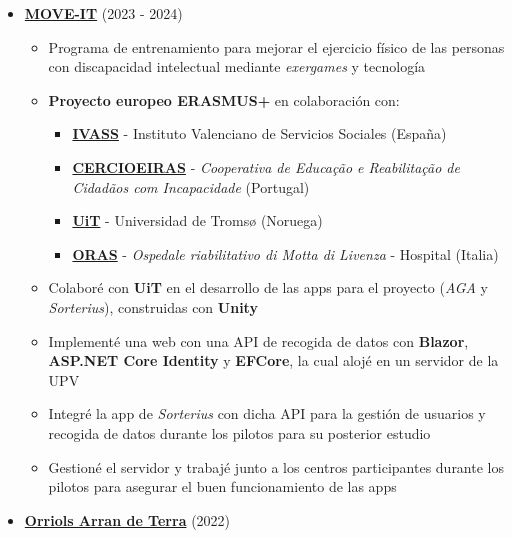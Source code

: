 \documentclass[letterpaper, 12pt, dvipsnames]{article}
\newcommand{\upv}{UPV}
\begin{document}
\vspace{1em}

\begin{itemize}
    \item {\large\textbf{\href{https://moveit.webs.upv.es/es/}{MOVE-IT}}} (2023 - 2024)
          \begin{itemize}
              \item Programa de entrenamiento para mejorar el ejercicio físico de las personas con discapacidad intelectual mediante \textit{exergames} y tecnología
              \item \textbf{Proyecto europeo ERASMUS+} en colaboración con:
                    \begin{itemize}
                        \item \textbf{\href{https://www.ivass.gva.es/}{IVASS}} - Instituto Valenciano de Servicios Sociales (España)
                        \item \textbf{\href{https://www.cercioeiras.pt/pt}{CERCIOEIRAS}} - \textit{Cooperativa de Educação e Reabilitação de Cidadãos com Incapacidade} (Portugal)
                        \item \textbf{\href{https://en.uit.no/}{UiT}} - Universidad de Tromsø (Noruega)
                        \item \textbf{\href{https://www.ospedalemotta.it/it/}{ORAS}} - \textit{Ospedale riabilitativo di Motta di Livenza} - Hospital (Italia)
                    \end{itemize}
              \item Colaboré con \textbf{UiT} en el desarrollo de las apps para el proyecto (\textit{AGA} y \textit{Sorterius}), construidas con \textbf{Unity}
              \item Implementé una web con una API de recogida de datos con \textbf{Blazor}, \textbf{ASP.NET Core Identity} y \textbf{EFCore}, la cual alojé en un servidor de la \upv
              \item Integré la app de \textit{Sorterius} con dicha API para la gestión de usuarios y recogida de datos durante los pilotos para su posterior estudio
              \item Gestioné el servidor y trabajé junto a los centros participantes durante los pilotos para asegurar el buen funcionamiento de las apps
          \end{itemize}
    \item {\large\textbf{\href{https://orriolsarrandeterra.com/}{Orriols Arran de Terra}}} (2022)
          \begin{itemize}

\end{itemize}
\end{itemize}
\end{document}
